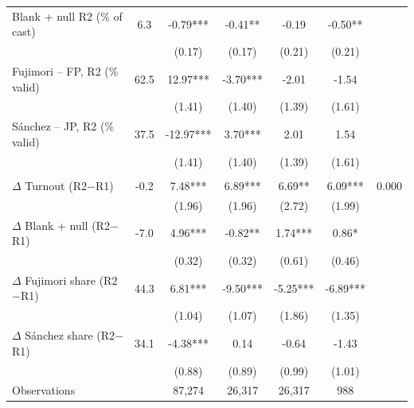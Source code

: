 \begin{tabular}{lcccccc}
Blank + null R2 (\% of cast) & 6.3 & -0.79*** & -0.41** & -0.19 & -0.50** &  \\
 &  & (0.17) & (0.17) & (0.21) & (0.21) &  \\[1pt]
Fujimori -- FP, R2 (\% valid) & 62.5 & 12.97*** & -3.70*** & -2.01 & -1.54 &  \\
 &  & (1.41) & (1.40) & (1.39) & (1.61) &  \\[1pt]
S\'anchez -- JP, R2 (\% valid) & 37.5 & -12.97*** & 3.70*** & 2.01 & 1.54 &  \\
 &  & (1.41) & (1.40) & (1.39) & (1.61) &  \\[1pt]
\addlinespace
\multicolumn{7}{l}{\emph{Panel C: Within-mesa change}} \\
$\Delta$ Turnout (R2$-$R1) & -0.2 & 7.48*** & 6.89*** & 6.69** & 6.09*** & 0.000 \\
 &  & (1.96) & (1.96) & (2.72) & (1.99) &  \\[1pt]
$\Delta$ Blank + null (R2$-$R1) & -7.0 & 4.96*** & -0.82** & 1.74*** & 0.86* &  \\
 &  & (0.32) & (0.32) & (0.61) & (0.46) &  \\[1pt]
$\Delta$ Fujimori share (R2$-$R1) & 44.3 & 6.81*** & -9.50*** & -5.25*** & -6.89*** &  \\
 &  & (1.04) & (1.07) & (1.86) & (1.35) &  \\[1pt]
$\Delta$ S\'anchez share (R2$-$R1) & 34.1 & -4.38*** & 0.14 & -0.64 & -1.43 &  \\
 &  & (0.88) & (0.89) & (0.99) & (1.01) &  \\[1pt]
\addlinespace
\midrule
Observations &  & 87,274 & 26,317 & 26,317 & 988 &  \\
\bottomrule
\end{tabular}